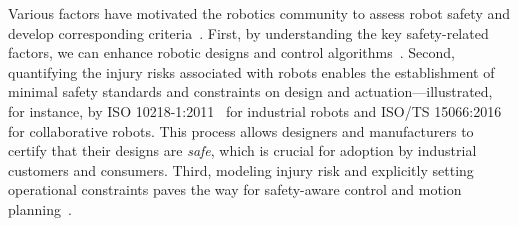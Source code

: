 
Various factors have motivated the robotics community to assess robot safety and develop corresponding criteria~\citep{de2008atlas, van2018spatial}. 
First, by understanding the key safety-related factors, we can enhance robotic designs and control algorithms~\citep{bicchi2004fast, zinn2004new, albu2007dlr, bischoff2010kuka, park2011designing, mansfeld2018safety}. Second, quantifying the injury risks associated with robots enables the establishment of minimal safety standards and constraints on design and actuation—illustrated, for instance, by ISO 10218-1:2011~\citep{iso2011industrial} for industrial robots and ISO/TS 15066:2016~\citep{iso2016collaborative} for collaborative robots. This process allows designers and manufacturers to certify that their designs are \emph{safe}, which is crucial for adoption by industrial customers and consumers. Third, modeling injury risk and explicitly setting operational constraints paves the way for safety-aware control and motion planning~\citep{lacevic2011safety, haddadin2013towards, iso2016collaborative, bertino2023prescribed, ferraguti2020control, lacevic2022safe, pupa2024efficient}.

